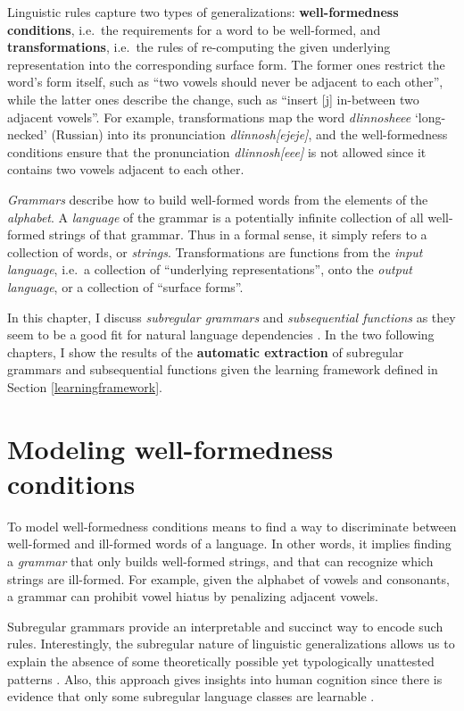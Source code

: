 Linguistic rules capture two types of generalizations: \textbf{well-formedness conditions}, i.e.\ the requirements for a word to be well-formed, and \textbf{transformations}, i.e.\ the rules of re-computing the given underlying representation into the corresponding surface form.
The former ones restrict the word's form itself, such as ``two vowels should never be adjacent to each other'', while the latter ones describe the change, such as ``insert {[}j{]} in-between two adjacent vowels''.
For example, transformations map the word \emph{dlinnosheee} `long-necked' (Russian) into its pronunciation \emph{dlinnosh[ejeje]}, and the well-formedness conditions ensure that the pronunciation \emph{dlinnosh[eee]} is not allowed since it contains two vowels adjacent to each other.


\emph{Grammars} describe how to build well-formed words from the elements of the \emph{alphabet}.
A \emph{language} of the grammar is a potentially infinite collection of all well-formed strings of that grammar.
Thus in a formal sense, it simply refers to a collection of words, or \emph{strings}.
Transformations are functions from the \emph{input language}, i.e.\ a collection of ``underlying representations'', onto the \emph{output language}, or a collection of ``surface forms''.


In this chapter, I discuss \emph{subregular grammars} and \emph{subsequential functions} as they seem to be a good fit for natural language dependencies \citep[i.a.]{Heinz11part1,HeinzRawal11,GainorLai12,Heinz-Lai-2013-VHS,AksenovaEtAl16,Graf17CLSpres,ChandleeHeinz2018}.
In the two following chapters, I show the results of the \textbf{automatic extraction} of subregular grammars and subsequential functions given the learning framework defined in Section \ref{learningframework}.


\section{Modeling well-formedness conditions}

To model well-formedness conditions means to find a way to discriminate between well-formed and ill-formed words of a language.
In other words, it implies finding a \emph{grammar} that only builds well-formed strings, and that can recognize which strings are ill-formed.
For example, given the alphabet of vowels and consonants, a grammar can prohibit vowel hiatus by penalizing adjacent vowels.

Subregular grammars provide an interpretable and succinct way to encode such rules.
Interestingly, the subregular nature of linguistic generalizations allows us to explain the absence of some theoretically possible yet typologically unattested patterns \citep{GainorLai12}.
Also, this approach gives insights into human cognition since there is evidence that only some subregular language classes are learnable \citep{Lai15}.

